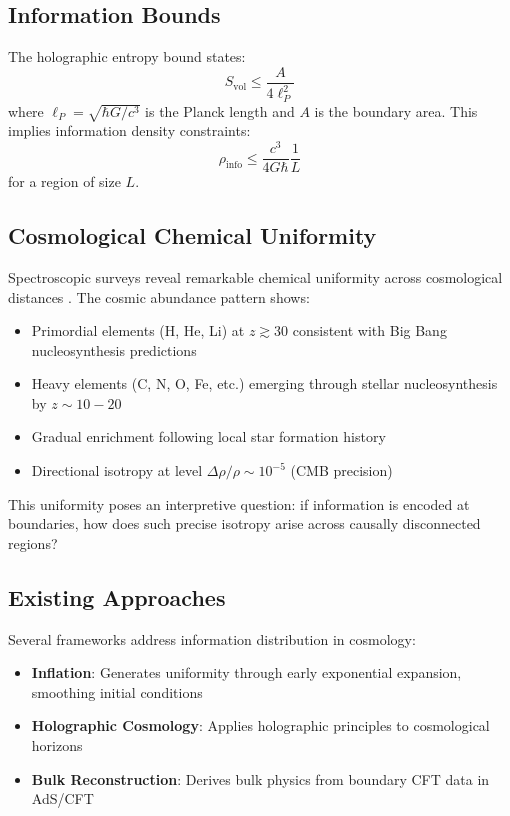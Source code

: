 \documentclass[twocolumn,aps,prd,superscriptaddress,nofootinbib]{revtex4-2}
\begin{document}
\subsection{Information Bounds}

The holographic entropy bound states:
\begin{equation}
S_{\text{vol}} \leq \frac{A}{4 \ell_P^2}
\label{eq:holographic_bound}
\end{equation}
where $\ell_P = \sqrt{\hbar G/c^3}$ is the Planck length and $A$ is the boundary area. This implies information density constraints:
\begin{equation}
\rho_{\text{info}} \leq \frac{c^3}{4 G \hbar} \frac{1}{L}
\end{equation}
for a region of size $L$.

\subsection{Cosmological Chemical Uniformity}

Spectroscopic surveys reveal remarkable chemical uniformity across cosmological distances \cite{Madau2014}. The cosmic abundance pattern shows:
\begin{itemize}
    \item Primordial elements (H, He, Li) at $z \gtrsim 30$ consistent with Big Bang nucleosynthesis predictions
    \item Heavy elements (C, N, O, Fe, etc.) emerging through stellar nucleosynthesis by $z \sim 10-20$
    \item Gradual enrichment following local star formation history
    \item Directional isotropy at level $\Delta\rho/\rho \sim 10^{-5}$ (CMB precision)
\end{itemize}

This uniformity poses an interpretive question: if information is encoded at boundaries, how does such precise isotropy arise across causally disconnected regions?

\subsection{Existing Approaches}

Several frameworks address information distribution in cosmology:

\begin{itemize}
    \item \textbf{Inflation}: Generates uniformity through early exponential expansion, smoothing initial conditions \cite{Guth1981}
    \item \textbf{Holographic Cosmology}: Applies holographic principles to cosmological horizons \cite{Bousso2002}
    \item \textbf{Bulk Reconstruction}: Derives bulk physics from boundary CFT data in AdS/CFT \cite{Maldacena1999}
\end{itemize}
\end{document}
